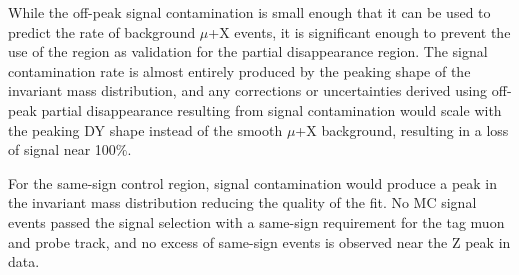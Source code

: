 While the off-peak signal contamination is small enough that it can be used to predict the rate of background $\mu$+X events, it is significant enough to prevent the use of the region as validation for the partial disappearance region. The signal contamination rate is almost entirely produced by the peaking shape of the invariant mass distribution, and any corrections or uncertainties derived using off-peak partial disappearance resulting from signal contamination would scale with the peaking DY shape instead of the smooth $\mu$+X background, resulting in a loss of signal near 100$\%$.

For the same-sign control region, signal contamination would produce a peak in the invariant mass distribution reducing the quality of the fit. No MC signal events passed the signal selection with a same-sign requirement for the tag muon and probe track, and no excess of same-sign events is observed near the Z peak in data.

